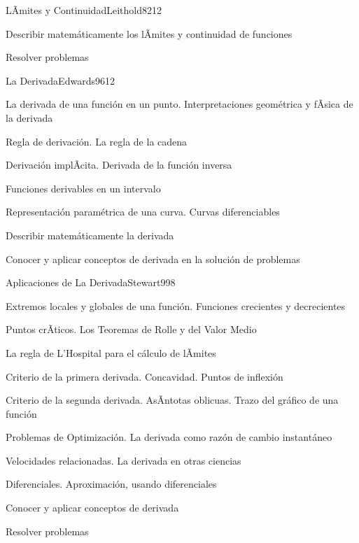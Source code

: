 \begin{syllabus}
\begin{unit}{LÃ­mites y Continuidad}{Leithold82}{12}
   \begin{unitgoals}
      \item Describir matemáticamente los lÃ­mites y continuidad de funciones
	\item Resolver problemas
   \end{unitgoals}
\end{unit}

\begin{unit}{La Derivada}{Edwards96}{12}
\begin{topics}
	\item La derivada de una función en un punto. Interpretaciones geométrica y fÃ­sica de la derivada
	\item Regla de derivación. La regla de la cadena
	\item Derivación implÃ­cita. Derivada de la función inversa
	\item Funciones derivables en un intervalo
	\item Representación paramétrica de una curva. Curvas diferenciables
\end{topics}

\begin{unitgoals}
	\item Describir matemáticamente la derivada
	\item Conocer y aplicar conceptos de derivada en la solución de problemas
\end{unitgoals}
\end{unit}

\begin{unit}{Aplicaciones de La Derivada}{Stewart99}{8}
\begin{topics}
	\item Extremos locales y globales de una función. Funciones crecientes y decrecientes
	\item Puntos crÃ­ticos. Los Teoremas de Rolle y del Valor Medio
	\item La regla de L'Hospital para el cálculo de lÃ­mites
	\item Criterio de la primera derivada. Concavidad. Puntos de inflexión
	\item Criterio de la segunda derivada. AsÃ­ntotas oblicuas. Trazo del gráfico de una función
	\item Problemas de Optimización. La derivada como razón de cambio instantáneo
	\item Velocidades relacionadas. La derivada en otras ciencias
	\item Diferenciales. Aproximación, usando diferenciales
\end{topics}

\begin{unitgoals}
	\item Conocer y aplicar conceptos de derivada
	\item Resolver problemas
\end{unitgoals}
\end{unit}

\begin{coursebibliography}
\end{coursebibliography}
\end{syllabus}


